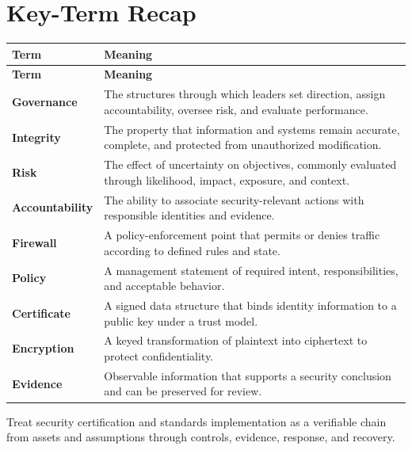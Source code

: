 \documentclass[11pt]{article}
\begin{document}
\section*{Key-Term Recap}
\begin{longtable}{>{\RaggedRight\arraybackslash}p{}>{\RaggedRight\arraybackslash}p{}}
\toprule\rowcolor{Navy}\color{white}\textbf{Term} & \color{white}\textbf{Meaning}\\\midrule
\endfirsthead
\toprule\rowcolor{Navy}\color{white}\textbf{Term} & \color{white}\textbf{Meaning}\\\midrule
\endhead
\textbf{Governance} & The structures through which leaders set direction, assign accountability, oversee risk, and evaluate performance. \\\midrule
\textbf{Integrity} & The property that information and systems remain accurate, complete, and protected from unauthorized modification. \\\midrule
\textbf{Risk} & The effect of uncertainty on objectives, commonly evaluated through likelihood, impact, exposure, and context. \\\midrule
\textbf{Accountability} & The ability to associate security-relevant actions with responsible identities and evidence. \\\midrule
\textbf{Firewall} & A policy-enforcement point that permits or denies traffic according to defined rules and state. \\\midrule
\textbf{Policy} & A management statement of required intent, responsibilities, and acceptable behavior. \\\midrule
\textbf{Certificate} & A signed data structure that binds identity information to a public key under a trust model. \\\midrule
\textbf{Encryption} & A keyed transformation of plaintext into ciphertext to protect confidentiality. \\\midrule
\textbf{Evidence} & Observable information that supports a security conclusion and can be preserved for review. \\\midrule
\bottomrule
\end{longtable}
\begin{takeawaybox}
Treat security certification and standards implementation as a verifiable chain from assets and assumptions through controls, evidence, response, and recovery.
\end{takeawaybox}
\end{document}

